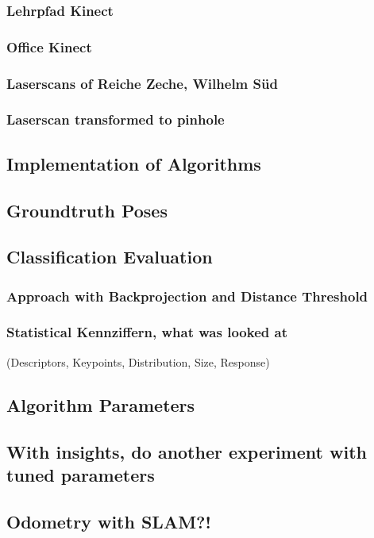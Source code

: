 \subsubsection{Lehrpfad Kinect}
\subsubsection{Office Kinect}
\subsubsection{Laserscans of Reiche Zeche, Wilhelm Süd}
\subsubsection{Laserscan transformed to pinhole}

\subsection{Implementation of Algorithms}
\subsection{Groundtruth Poses}
\subsection{Classification Evaluation}
\subsubsection{Approach with Backprojection and Distance Threshold}
\subsubsection{Statistical Kennziffern, what was looked at}
(Descriptors, Keypoints, Distribution, Size, Response)
\subsection{Algorithm Parameters}
\subsection{With insights, do another experiment with tuned parameters}
\subsection{Odometry with SLAM?!}

